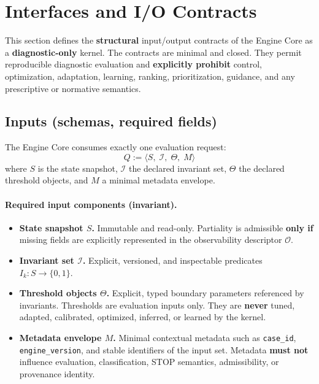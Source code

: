 ﻿\section{Interfaces and I/O Contracts}

This section defines the \textbf{structural} input/output contracts of the Engine
Core as a \textbf{diagnostic-only} kernel.
The contracts are minimal and closed.
They permit reproducible diagnostic evaluation and \textbf{explicitly prohibit}
control, optimization, adaptation, learning, ranking, prioritization, guidance,
and any prescriptive or normative semantics.

\subsection{Inputs (schemas, required fields)}

The Engine Core consumes exactly one evaluation request:
\[
Q := \langle S,\; \mathcal{I},\; \Theta,\; M \rangle
\]
where $S$ is the state snapshot, $\mathcal{I}$ the declared invariant set,
$\Theta$ the declared threshold objects, and $M$ a minimal metadata envelope.

\paragraph{Required input components (invariant).}
\begin{itemize}
  \item \textbf{State snapshot $S$.}
        Immutable and read-only.
        Partiality is admissible \textbf{only if} missing fields are explicitly
        represented in the observability descriptor $\mathcal{O}$.
  \item \textbf{Invariant set $\mathcal{I}$.}
        Explicit, versioned, and inspectable predicates
        $I_k : S \rightarrow \{0,1\}$.
  \item \textbf{Threshold objects $\Theta$.}
        Explicit, typed boundary parameters referenced by invariants.
        Thresholds are evaluation inputs only.
        They are \textbf{never} tuned, adapted, calibrated, optimized,
        inferred, or learned by the kernel.
  \item \textbf{Metadata envelope $M$.}
        Minimal contextual metadata such as \texttt{case\_id},
        \texttt{engine\_version}, and stable identifiers of the input set.
        Metadata \textbf{must not} influence evaluation, classification,
        STOP semantics, admissibility, or provenance identity.
\end{itemize}

